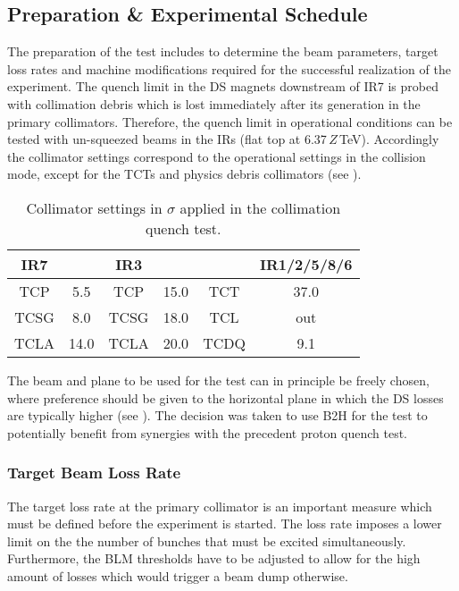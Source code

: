 
\subsection{Preparation \& Experimental Schedule}

The preparation of the test includes to determine the beam parameters, target loss rates and machine modifications required for the successful realization of the experiment. The quench limit in the DS magnets downstream of IR7 is probed with collimation debris which is lost immediately after its generation in the primary collimators. Therefore, the quench limit in operational conditions can be tested with un-squeezed beams in the IRs (flat top at 6.37\,$Z$\,TeV). Accordingly the collimator settings correspond to the operational settings in the collision mode, except for the TCTs and physics debris collimators (see ). 

\begin{table}[htbp]
\centering
\caption{Collimator settings in $\sigma$ applied in the collimation quench test.}
\label{tab:sets_qt}
\begin{tabular}{cccccc} 
\toprule
IR7    &       &   IR3   &          &    & IR1/2/5/8/6 \\ \midrule
TCP    &  5.5  &   TCP   &  15.0    &    TCT  &   37.0 \\ 
TCSG   &  8.0  &   TCSG  &  18.0    &    TCL  &   out  \\
TCLA   & 14.0  &   TCLA  &  20.0    &   TCDQ  &   9.1  \\ \bottomrule
\end{tabular}
\end{table}

The beam and plane to be used for the test can in principle be freely chosen, where preference should be given to the horizontal plane in which the DS losses are typically higher (see \chapref{}). The decision was taken to use B2H for the test to potentially benefit from synergies with the precedent proton quench test. 



\subsubsection{Target Beam Loss Rate}

The target loss rate at the primary collimator is an important measure which  must be defined before the experiment is started. The loss rate imposes a lower limit on the the number of bunches that must be excited simultaneously. Furthermore, the BLM thresholds have to be adjusted to allow for the high amount of losses which would trigger a beam dump otherwise. 

